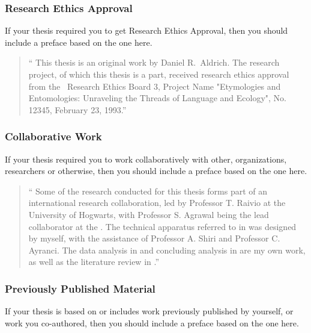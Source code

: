 			\subsubsection{Research Ethics Approval}
				If your thesis required you to get Research Ethics Approval, then you should include a preface based on the one here.

				\begin{quote}
					\enquote{%
						This thesis is an original work by Daniel R.\ Aldrich. 
						The research project, of which this thesis is a part, received research ethics approval from the \UofA\ Research Ethics Board 3, Project Name "Etymologies and Entomologies: Unraveling the Threads of Language and Ecology", No. 12345, February 23, 1993.}%
				\end{quote}

			\subsubsection{Collaborative Work}
				If your thesis required you to work collaboratively with other, organizations, researchers or otherwise, then you should include a preface based on the one here.

				\begin{quote}
					\enquote{%
						Some of the research conducted for this thesis forms part of an international research collaboration, led by Professor T. Raivio at the University of Hogwarts, with Professor S. Agrawal being the lead collaborator at the \UofA. 
						The technical apparatus referred to in  was designed by myself, with the assistance of Professor A. Shiri and Professor C. Ayranci. 
						The data analysis in  and concluding analysis in  are my own work, as well as the literature review in .}
				\end{quote}

			\subsubsection{Previously Published Material}
				If your thesis is based on or includes work previously published by yourself, or work you co-authored, then you should include a preface based on the one here.

